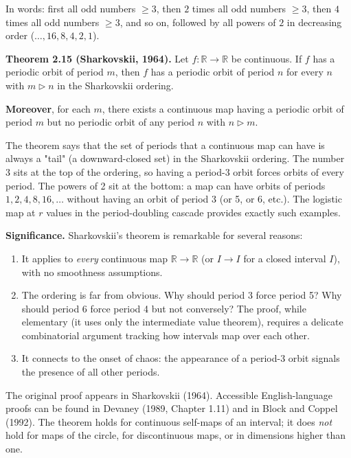 In words: first all odd numbers $\geq 3$, then $2$ times all odd numbers $\geq 3$, then $4$ times all odd numbers $\geq 3$, and so on, followed by all powers of $2$ in decreasing order ($\ldots, 16, 8, 4, 2, 1$).

\textbf{Theorem 2.15 (Sharkovskii, 1964).} Let $f: \mathbb{R} \to \mathbb{R}$ be continuous. If $f$ has a periodic orbit of period $m$, then $f$ has a periodic orbit of period $n$ for every $n$ with $m \triangleright n$ in the Sharkovskii ordering.

\textbf{Moreover}, for each $m$, there exists a continuous map having a periodic orbit of period $m$ but no periodic orbit of any period $n$ with $n \triangleright m$.

The theorem says that the set of periods that a continuous map can have is always a "tail" (a downward-closed set) in the Sharkovskii ordering. The number 3 sits at the top of the ordering, so having a period-3 orbit forces orbits of every period. The powers of 2 sit at the bottom: a map can have orbits of periods $1, 2, 4, 8, 16, \ldots$ without having an orbit of period 3 (or 5, or 6, etc.). The logistic map at $r$ values in the period-doubling cascade provides exactly such examples.

\textbf{Significance.} Sharkovskii's theorem is remarkable for several reasons:

\begin{enumerate}[nosep]
  \item It applies to \textit{every} continuous map $\mathbb{R} \to \mathbb{R}$ (or $I \to I$ for a closed interval $I$), with no smoothness assumptions.
  \item The ordering is far from obvious. Why should period 3 force period 5? Why should period 6 force period 4 but not conversely? The proof, while elementary (it uses only the intermediate value theorem), requires a delicate combinatorial argument tracking how intervals map over each other.
  \item It connects to the onset of chaos: the appearance of a period-3 orbit signals the presence of all other periods.
\end{enumerate}

The original proof appears in Sharkovskii (1964). Accessible English-language proofs can be found in Devaney (1989, Chapter 1.11) and in Block and Coppel (1992). The theorem holds for continuous self-maps of an interval; it does \textit{not} hold for maps of the circle, for discontinuous maps, or in dimensions higher than one.



